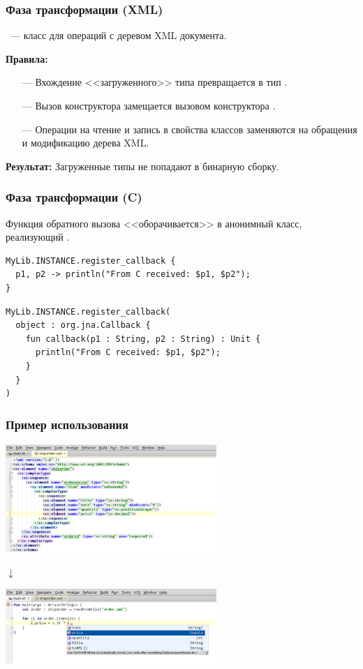 \documentclass[12pt]{beamer}
\newcommand{\nl}{\vspace{\baselineskip}}
\newcommand{\darrow}{\center{\Large{$\mathbf\downarrow$}}}
\begin{document}
\begin{frame}\frametitle{Фаза трансформации (XML)}

~--- класс для операций с деревом XML документа. \nl

\textbf{Правила:}
\begin{itemize}
\item[---] Вхождение <<загруженного>> типа превращается в тип .
\item[---] Вызов конструктора замещается вызовом конструктора .
\item[---] Операции на чтение и запись в свойства классов заменяются на обращения и модификацию дерева XML.
\end{itemize}

\nl

\textbf{Результат:}
Загруженные типы не попадают в бинарную сборку.

\end{frame}

\begin{frame}[containsverbatim]\frametitle{Фаза трансформации (C)}

Функция обратного вызова <<оборачивается>> в анонимный класс, реализующий . \nl

\begin{lstlisting}
MyLib.INSTANCE.register_callback {
  p1, p2 -> println("From C received: $p1, $p2");
}
\end{lstlisting}

\darrow

\begin{lstlisting}
MyLib.INSTANCE.register_callback(
  object : org.jna.Callback {
    fun callback(p1 : String, p2 : String) : Unit {
      println("From C received: $p1, $p2");
    }
  }
)
\end{lstlisting}
\end{frame}

\begin{frame}\frametitle{Пример использования}
\begin{center}
    \includegraphics[height=4.132cm,width=8cm]{shiporder}

    {$\mathbf\downarrow$} %

    \includegraphics[height=2.829cm,width=8cm]{completion}
\end{center}
\end{frame}
\end{document}
